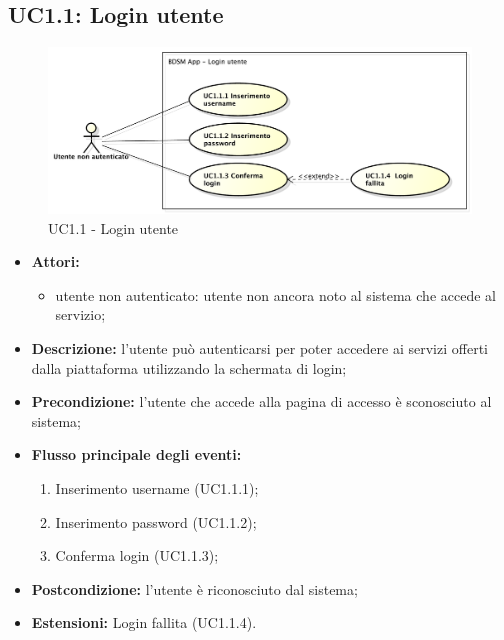 \pagebreak


\subsection{UC1.1: Login utente}

\begin{figure}[htbp]
	\centering
	\centerline{\includegraphics[scale=0.45]{./images/UC1_1.pdf}}
	\caption{UC1.1 - Login utente}
\end{figure}

\begin{itemize}
	\item \textbf{Attori:}
	\begin{itemize}
		\item utente non autenticato: utente non ancora noto al sistema che accede al servizio;
	\end{itemize}
	\item \textbf{Descrizione:} l'utente può autenticarsi per poter accedere ai servizi offerti dalla piattaforma utilizzando la schermata di login;
	\item \textbf{Precondizione:} l'utente che accede alla pagina di accesso è sconosciuto al sistema;
	\item \textbf{Flusso principale degli eventi:}
	\begin{enumerate}
		\item Inserimento username (UC1.1.1);
		\item Inserimento password (UC1.1.2);
		\item Conferma login (UC1.1.3);
	\end{enumerate}
	\item \textbf{Postcondizione:} l'utente è riconosciuto dal sistema;
	\item \textbf{Estensioni:} Login fallita (UC1.1.4).
\end{itemize}

